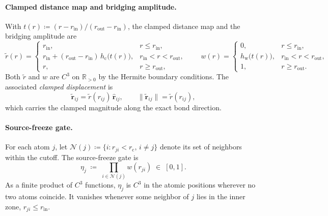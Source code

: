 \paragraph{Clamped distance map and bridging amplitude.}
With $t(r)\coloneqq(r-r_{\mathrm{in}})/(r_{\mathrm{out}}-r_{\mathrm{in}})$,
the clamped distance map and the bridging amplitude are
\begin{equation}
    \widetilde{r}(r) =
    \begin{cases}
        r_{\mathrm{in}}, & r\le r_{\mathrm{in}},               \\
        r_{\mathrm{in}}+(r_{\mathrm{out}}-r_{\mathrm{in}})\,h_{\mathrm{c}}\!\bigl(t(r)\bigr),
                         & r_{\mathrm{in}}<r<r_{\mathrm{out}}, \\
        r,               & r\ge r_{\mathrm{out}},
    \end{cases}
    \qquad
    w(r) =
    \begin{cases}
        0,                                & r\le r_{\mathrm{in}},               \\
        h_{\mathrm{w}}\!\bigl(t(r)\bigr), & r_{\mathrm{in}}<r<r_{\mathrm{out}}, \\
        1,                                & r\ge r_{\mathrm{out}}.
    \end{cases}
    \label{eq:dpa4-clamp}
\end{equation}
Both $\widetilde{r}$ and $w$ are $C^3$ on $\mathbb{R}_{>0}$ by the Hermite boundary conditions.
The associated \emph{clamped displacement} is
\begin{equation}
    \widetilde{\mathbf{r}}_{ij} = \widetilde{r}(r_{ij})\,\widehat{\mathbf{r}}_{ij},
    \qquad \|\widetilde{\mathbf{r}}_{ij}\|=\widetilde{r}(r_{ij}),
    \label{eq:dpa4-rvec-tilde}
\end{equation}
which carries the clamped magnitude along the exact bond direction.

\paragraph{Source-freeze gate.}
For each atom $j$, let $\mathcal{N}(j)\coloneqq \{i:r_{ji}<r_{\mathrm{c}},\,i\neq j\}$ denote its set of neighbors within the cutoff.
The source-freeze gate is
\begin{equation}
    \eta_j \;\coloneqq\; \prod_{i\in\mathcal{N}(j)} w(r_{ji})
    \;\in\;[0,1].
    \label{eq:dpa4-source-freeze}
\end{equation}
As a finite product of $C^3$ functions, $\eta_j$ is $C^3$ in the atomic positions wherever no two atoms coincide.
It vanishes whenever some neighbor of $j$ lies in the inner zone, $r_{ji}\le r_{\mathrm{in}}$.

